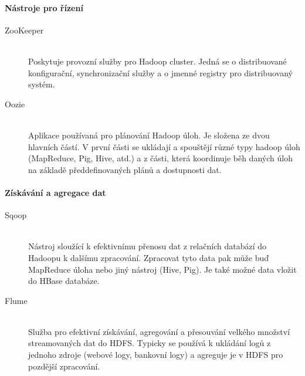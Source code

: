 \documentclass[thesis=M,czech]{FITthesis}[2012/06/26]
\begin{document}
\paragraph{Nástroje pro řízení}
\begin{description}
\item[ZooKeeper] \hfill \\
Poskytuje provozní služby pro Hadoop cluster. Jedná se o distribuované konfigurační, synchronizační služby a o jmenné registry pro distribuovaný systém. 

\item[Oozie] \hfill \\
Aplikace používaná pro plánování Hadoop úloh. Je složena ze dvou hlavních částí. V první části se ukládají a spouštějí různé typy hadoop úloh (MapReduce, Pig, Hive, atd.) a z části, která koordinuje běh daných úloh na základě předdefinovaných plánů a dostupnosti dat.
\end{description}

\paragraph{Získávání a agregace dat}
\begin{description}
\item[Sqoop] \hfill \\
Nástroj sloužící k efektivnímu přenosu dat z relačních databází do Hadoopu k dalšímu zpracování. Zpracovat tyto data pak může buď MapReduce úloha nebo jiný nástroj (Hive, Pig). Je také možné data vložit do HBase databáze.
\item[Flume] \hfill \\
Služba pro efektivní získávání, agregování a přesouvání velkého množství streamovaných dat do HDFS. Typicky se používá k ukládání logů z jednoho zdroje (webové logy, bankovní logy) a agreguje je v HDFS pro pozdější zpracování.
\end{description}
\end{document}
